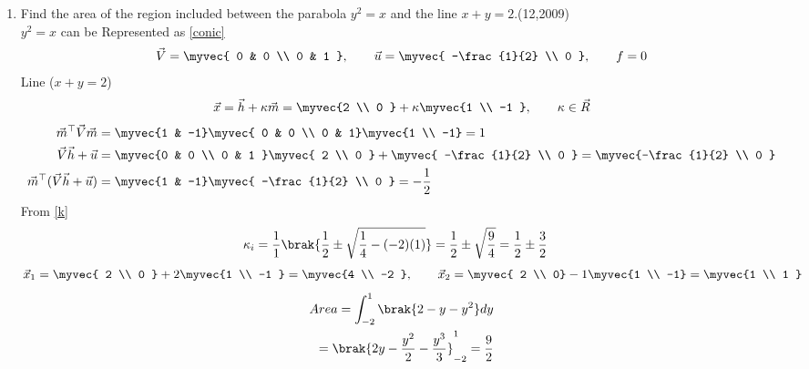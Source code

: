 \begin{enumerate}[label=\thesubsection.\arabic*, ref=\thesubsection.\theenumi]
 \item Find the area of the region included between the parabola $y^2 = x$ and the line $x + y = 2$.\hfill{(12,2009)} \\
 \solution
 	$y^2=x$ can be Represented as \eqref{conic}
 	\begin{align}
 	\vec{V} = \myvec{ 0 & 0 \\ 0 & 1 }, \qquad
 	\vec{u} = \myvec{ -\frac{1}{2} \\ 0 }, \qquad
 	f = 0
 	\end{align}
 	Line ($x + y = 2$)
 	 \begin{align}
 	 	\vec{x} = \vec{h} + \kappa\vec{m} = \myvec {2 \\ 0 } + \kappa\myvec {1 \\ -1 }, \qquad \kappa \in \vec{R}
 \end{align}
 \begin{align}
 	\vec{m}^\top\vec{V}\vec{m} &= \myvec{1 & -1} \myvec{ 0 & 0 \\ 0 & 1}\myvec{1 \\ -1} = 1 \\
 	\vec{V}\vec{h} + \vec{u} &= \myvec{0 & 0 \\ 0 & 1 }\myvec{ 2 \\ 0 } + \myvec{ -\frac{1}{2} \\ 0 } = \myvec{-\frac{1}{2} \\ 0 } \\
	\vec{m}^\top(\vec{V}\vec{h} + \vec{u}) &= \myvec {1 & -1}\myvec{ -\frac{1}{2} \\ 0 } =-\frac{1}{2} 
\end{align}
From \eqref{k}
	\begin{align}
		\kappa_i &= \frac{1}{1}\brak{\frac{1}{2} \pm \sqrt{\frac{1}{4} - (-2)(1)}} = \frac{1}{2} \pm \sqrt{\frac{9}{4}} = \frac{1}{2} \pm \frac{3}{2}
	\end{align}
 	\begin{align}
 		\vec{x}_1 = \myvec{ 2 \\ 0 } + 2\myvec{1 \\ -1 }= \myvec{4 \\ -2 }, \qquad \vec{x}_2 = \myvec{ 2 \\ 0} - 1\myvec {1 \\ -1} = \myvec {1 \\ 1 }
 		\end{align}
 		\begin{align}
 		Area =\int_{-2}^{1} \brak{2 - y - y^2} dy \\
 			= \brak{2y - \frac{y^2}{2} - \frac{y^3}{3}}_{-2}^{1} 
 			=\frac{9}{2}
 			\end{align}


\end{enumerate}
